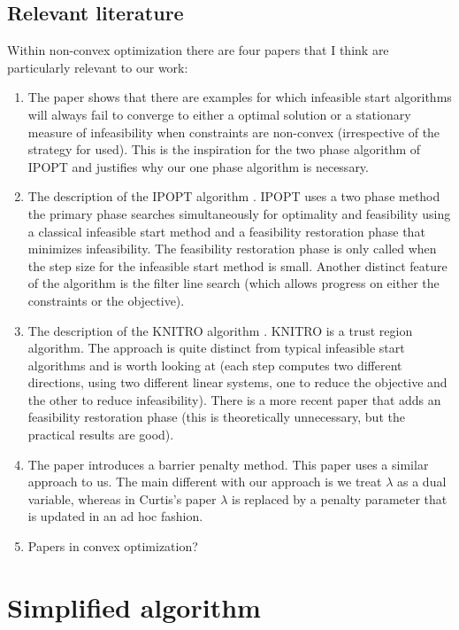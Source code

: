 \documentclass{article}
\begin{document}
\subsection{Relevant literature}

Within non-convex optimization there are four papers that I think are particularly relevant to our work:

\begin{enumerate}
\item The paper \cite{wachter2000failure} shows that there are examples for which infeasible start algorithms will always fail to converge to either a optimal solution or a stationary measure of infeasibility when constraints are non-convex (irrespective of the strategy for used). This is the inspiration for the two phase algorithm of IPOPT and justifies why our one phase algorithm is necessary.
\item The description of the IPOPT algorithm \cite{wachter2005line}. IPOPT uses a two phase method the primary phase searches simultaneously for optimality and feasibility using a classical infeasible start method and a feasibility restoration phase that minimizes infeasibility. The feasibility restoration phase is only called when the step size for the infeasible start method is small. Another distinct feature of the algorithm is the filter line search (which allows progress on either the constraints or the objective).
\item The description of the KNITRO algorithm \cite{byrd2006knitro}. KNITRO is a trust region algorithm. The approach is quite distinct from typical infeasible start algorithms and is worth looking at (each step computes two different directions, using two different linear systems, one to reduce the objective and the other to reduce infeasibility). There is a more recent paper \cite{nocedal2014interior} that adds an feasibility restoration phase (this is theoretically unnecessary, but the practical results are good). 
\item The paper \cite{curtis2012penalty} introduces a barrier penalty method. This paper uses a similar approach to us. The main different with our approach is we treat $\lambda$ as a dual variable, whereas in Curtis's paper $\lambda$ is replaced by a penalty parameter that is updated in an ad hoc fashion.
\item Papers in convex optimization?
\end{enumerate}



\section{Simplified algorithm}
\end{document}
